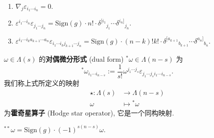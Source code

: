 \begin{theorem}
	\ 
    \begin{enumerate}
        \item $\nabla_j\varepsilon_{i_1\cdots i_n}=0$.
        \item $\varepsilon^{i_1\cdots i_n}\varepsilon_{j_1\cdots j_n}=\mathrm{Sign}(g)\cdot n!\cdot\delta^{[i_1}{}_{j_1}\cdots\delta^{i_n]}{}_{j_n}$.
        \item $\varepsilon^{i_1\cdots i_k a_{k+1}\cdots a_n}\varepsilon_{i_1\cdots i_k j_{k+1}\cdots j_n}=\mathrm{Sign}(g)\cdot (n-k)!k!\cdot\delta^{[a_{k+1}}{}_{b_{k+1}}\cdots\delta^{a_n]}{}_{b_n}.$
    \end{enumerate}
\end{theorem}

\begin{definition}[对偶微分形式]
    $ \omega\in\Lambda(s) $ 的{\bf 对偶微分形式} (dual form) $ {}^{*}\omega\in\Lambda(n-s) $ 为 
    \[ {}^{*}\omega_{i_1\cdots i_{n-s}}:=\frac{1}{s!}\omega^{j_1\cdots j_s}\varepsilon_{j_1\cdots j_si_1\cdots i_{n-s}}. \]
    我们称上式所定义的映射
    \begin{align*}
        \star:{}\Lambda(s)&\to\Lambda(n-s)\\
        \omega&\mapsto{}^{*}\omega
    \end{align*}
    为{\bf 霍奇星算子} (Hodge star operator), 它是一个同构映射.
\end{definition}

\begin{theorem}
    $ {}^{**}\omega=\mathrm{Sign}(g)\cdot(-1)^{s(n-s)}\omega. $
\end{theorem}

